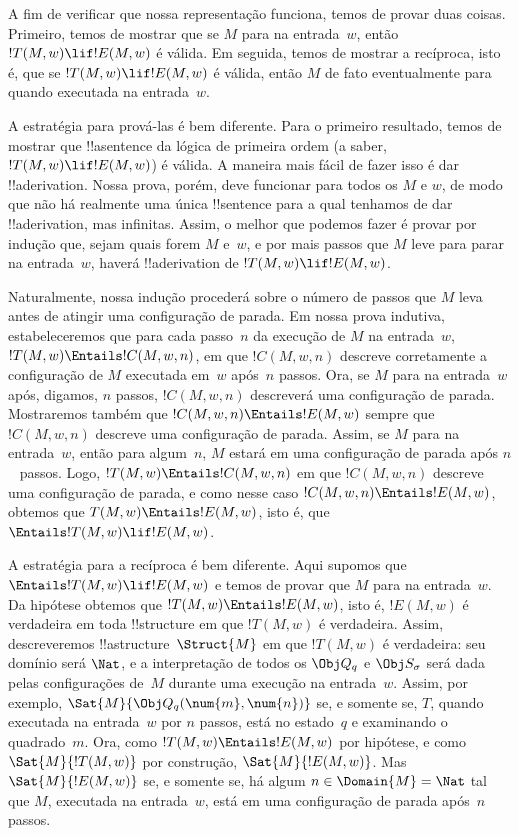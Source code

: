 \documentclass[../../../include/open-logic-section]{subfiles}
\begin{document}

\begin{explain}
A fim de verificar que nossa representação funciona, temos de provar
duas coisas. Primeiro, temos de mostrar que se $M$ para na entrada~$w$,
então $!T(M, w) \lif !E(M, w)$ é válida. Em seguida, temos de mostrar a
recíproca, isto é, que se $!T(M, w) \lif !E(M, w)$ é válida, então $M$
de fato eventualmente para quando executada na entrada~$w$.

A estratégia para prová-las é bem diferente. Para o primeiro
resultado, temos de mostrar que !!a{sentence} da lógica de primeira
ordem (a saber, $!T(M, w) \lif !E(M, w)$) é válida. A maneira mais
fácil de fazer isso é dar !!a{derivation}. Nossa prova, porém, deve
funcionar para todos os $M$ e $w$, de modo que não há realmente uma
única !!{sentence} para a qual tenhamos de dar !!a{derivation}, mas
infinitas. Assim, o melhor que podemos fazer é provar por indução que,
sejam quais forem $M$ e~$w$, e por mais passos que $M$ leve para parar
na entrada~$w$, haverá !!a{derivation} de $!T(M, w) \lif !E(M, w)$.

Naturalmente, nossa indução procederá sobre o número de passos que $M$
leva antes de atingir uma configuração de parada. Em nossa prova
indutiva, estabeleceremos que para cada passo~$n$ da execução de $M$ na
entrada~$w$, $!T(M, w) \Entails !C(M, w, n)$, em que $!C(M, w, n)$
descreve corretamente a configuração de $M$ executada em~$w$ após~$n$
passos. Ora, se $M$ para na entrada~$w$ após, digamos, $n$ passos,
$!C(M, w, n)$ descreverá uma configuração de parada. Mostraremos também
que $!C(M, w, n) \Entails !E(M, w)$ sempre que $!C(M, w, n)$ descreve
uma configuração de parada. Assim, se $M$ para na entrada~$w$, então
para algum~$n$, $M$ estará em uma configuração de parada após $n$~
passos. Logo, $!T(M, w) \Entails !C(M, w, n)$ em que $!C(M, w, n)$
descreve uma configuração de parada, e como nesse caso $!C(M, w, n)
\Entails !E(M, w)$, obtemos que $T(M, w) \Entails !E(M, w)$, isto é,
que $\Entails !T(M, w) \lif !E(M, w)$.

A estratégia para a recíproca é bem diferente. Aqui supomos que
$\Entails !T(M, w) \lif !E(M, w)$ e temos de provar que $M$ para na
entrada~$w$. Da hipótese obtemos que $!T(M, w) \Entails !E(M, w)$, isto
é, $!E(M, w)$ é verdadeira em toda !!{structure} em que $!T(M, w)$ é
verdadeira. Assim, descreveremos !!a{structure}~$\Struct{M}$ em que
$!T(M, w)$ é verdadeira: seu domínio será $\Nat$, e a interpretação de
todos os $\Obj Q_q$ e $\Obj S_\sigma$ será dada pelas configurações
de~$M$ durante uma execução na entrada~$w$. Assim, por exemplo,
$\Sat{M}{\Obj Q_q(\num{m}, \num{n})}$ se, e somente se, $T$, quando
executada na entrada~$w$ por $n$ passos, está no estado~$q$ e
examinando o quadrado~$m$. Ora, como $!T(M, w) \Entails !E(M, w)$ por
hipótese, e como $\Sat{M}{!T(M, w)}$ por construção, $\Sat{M}{!E(M,
w)}$. Mas $\Sat{M}{!E(M, w)}$ se, e somente se, há algum $n \in
\Domain{M} = \Nat$ tal que $M$, executada na entrada~$w$, está em uma
configuração de parada após~$n$ passos.
\end{explain}
\end{document}
